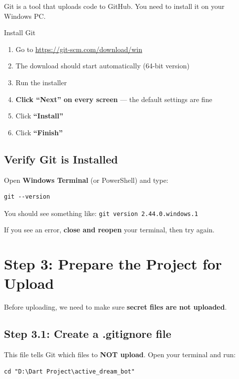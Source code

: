 Git is a tool that uploads code to GitHub. You need to install it on your Windows PC.

\begin{stepbox}{Install Git}
\begin{enumerate}[leftmargin=1.5cm]
    \item Go to \url{https://git-scm.com/download/win}
    \item The download should start automatically (64-bit version)
    \item Run the installer
    \item \textbf{Click ``Next'' on every screen} --- the default settings are fine
    \item Click \textbf{``Install''}
    \item Click \textbf{``Finish''}
\end{enumerate}
\end{stepbox}

\subsection{Verify Git is Installed}

Open \textbf{Windows Terminal} (or PowerShell) and type:

\begin{lstlisting}[style=termstyle]
git --version
\end{lstlisting}

You should see something like: \texttt{git version 2.44.0.windows.1}

If you see an error, \textbf{close and reopen} your terminal, then try again.

\section{Step 3: Prepare the Project for Upload}

Before uploading, we need to make sure \textbf{secret files are not uploaded}.

\subsection{Step 3.1: Create a .gitignore file}

This file tells Git which files to \textbf{NOT upload}. Open your terminal and run:

\begin{lstlisting}[style=termstyle]
cd "D:\Dart Project\active_dream_bot"
\end{lstlisting}

